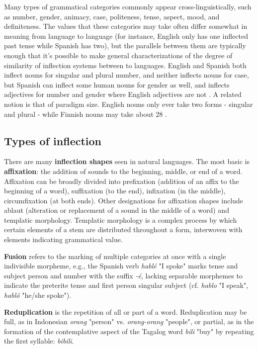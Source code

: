 Many types of grammatical categories commonly appear cross-linguistically, such as number, gender, animacy, case, politeness, tense, aspect, mood, and definiteness. The values that these categories may take often differ somewhat in meaning from language to language (for instance, English only has one inflected past tense while Spanish has two), but the parallels between them are typically enough that it's possible to make general characterizations of the degree of similarity of inflection systems between to languages. English and Spanish both inflect nouns for singular and plural number, and neither inflects nouns for case, but Spanish can inflect some human nouns for gender as well, and inflects adjectives for number and gender where English adjectives are not \parencite{Hogan2010}. A related notion is that of paradigm size. English nouns only ever take two forms - singular and plural - while Finnish nouns may take about 28 \parencite{Wiktionary}.

\subsection{Types of inflection}

There are many \textbf{inflection shapes} seen in natural languages. The most basic is \textbf{affixation}: the addition of sounds to the beginning, middle, or end of a word. Affixation can be broadly divided into prefixation (addition of an affix to the beginning of a word), suffixation (to the end), infixation (in the middle), circumfixation (at both ends). Other designations for affixation shapes include ablaut (alteration or replacement of a sound in the middle of a word) and templatic morphology. Templatic morphology is a complex process by which certain elements of a stem are distributed throughout a form, interwoven with elements indicating grammatical value. 

\textbf{Fusion} refers to the marking of multiple categories at once with a single indivisible morpheme, e.g., the Spanish verb \textit{hablé} "I spoke" marks tense and subject person and number with the suffix \textit{-é}, lacking separable morphemes to indicate the preterite tense and first person singular subject (cf. \textit{hablo} "I speak", \textit{habló} "he/she spoke"). 

\textbf{Reduplication} is the repetition of all or part of a word. Reduplication may be full, as in Indonesian \textit{orang} "person" vs. \textit{orang-orang} "people", or partial, as in the formation of the contemplative aspect of the Tagalog word \textit{bili} "buy" by repeating the first syllable: \textit{bibili}. 


